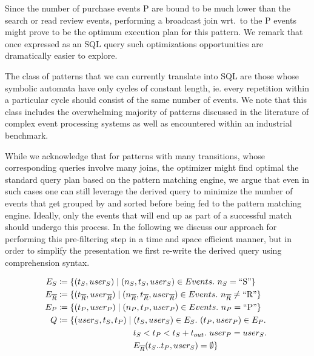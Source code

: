 Since the number of purchase events P are bound to be much lower than the
search or read review events, performing a broadcast join wrt.\ to the P events
might prove to be the optimum execution plan for this pattern. We remark that
once expressed as an SQL query such optimizations opportunities are dramatically
easier to explore.



The class of patterns that we can currently translate into SQL are those whose
symbolic automata have only cycles of constant length, ie. every repetition
within a particular cycle should consist of the same number of events. 
We note that this class includes the overwhelming majority of patterns discussed
in the literature of complex event processing systems as well as encountered
within an industrial benchmark.

While we acknowledge that for patterns with many transitions, whose
corresponding queries involve many joins, the optimizer might find optimal the
standard query plan based on the pattern matching engine,
we argue that even in such cases one can still leverage the derived query to
minimize the number of events that get grouped by and sorted before being fed to
the pattern matching engine.
Ideally, only the events that will end up as part of a successful match should
undergo this process.
In the following we discuss our approach for performing this pre-filtering step
in a time and space efficient manner, but in order to simplify the presentation
we first re-write the derived query using comprehension syntax.

\begin{align*}
E_S 
&\coloneq 
\{ (t_S, user_S) \mid 
(n_S, t_S, user_S) \in Events .\ n_S = \text{``S''}
\}
\\
E_{\oR} 
&\coloneq 
\{ (t_{\oR}, user_{\oR}) \mid 
(n_{\oR}, t_{\oR}, user_{\oR}) \in Events .\ n_{\oR} \neq \text{``R''}
\}
\\
E_P 
&\coloneq 
\{ (t_P, user_P) \mid 
(n_P, t_P, user_P) \in Events .\ n_P = \text{``P''}
\}
\\
Q 
&\coloneq 
\{ (user_S, t_S, t_P) \mid 
(t_S, user_S) \in E_S .\ 
(t_P, user_P) \in E_P .\
\\ 
&\qqqquad\quad
t_S < t_P < t_S + t_{out} .\ 
user_P = user_S .\ 
\\
&\qqqquad\quad
E_{\oR}(t_S..t_P, user_S) = \emptyset  
\}
\\
\end{align*}



